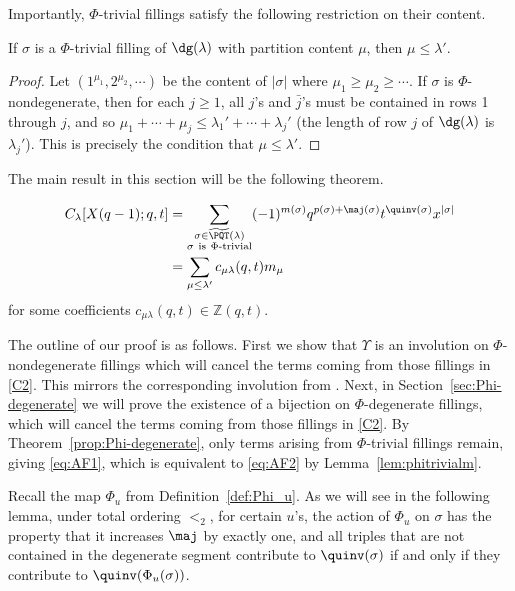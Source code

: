 Importantly, $\Phi$-trivial fillings satisfy the following restriction on their content.

\begin{lemma}\label{lem:phitrivialm}
If $\sigma$ is a $\Phi$-trivial filling of $\dg(\lambda)$ with partition content $\mu$, then $\mu \leq \lambda'$.
\end{lemma}

\begin{proof}
Let $(1^{\mu_1},2^ {\mu_2},\cdots)$ be the content of $|\sigma|$ where $\mu_1\geq \mu_2\geq \cdots$. If $\sigma$ is $\Phi$-nondegenerate, then for each $j \geq 1$, all $j$'s and $\bar{j}$'s must be contained in rows 1 through $j$, and so $\mu_1+\cdots+\mu_j \leq \lambda_1'+\cdots+\lambda_j'$ (the length of row $j$ of $\dg(\lambda)$ is $\lambda_j'$). This is precisely the condition that $\mu\leq \lambda'$.
\end{proof}


The main result in this section will be the following theorem.

\begin{theorem}\label{thm:A2FP}
\begin{align}
C_{\lambda}[X(q-1);q,t]& = \sum_{\substack{\sigma\in\widetilde{\PQT}(\lambda)\\\sigma\ \text{is}\ \Phi\text{-trivial}}} (-1)^{m(\sigma)} q^{p(\sigma)+\maj(\sigma)}t^{\quinv(\sigma)}x^{|\sigma|}\label{eq:AF1}\\
&=\sum_{\mu \leq \lambda'} c_{\mu\lambda}(q,t)m_{\mu}\label{eq:AF2}
\end{align}
for some coefficients $c_{\mu\lambda}(q,t)\in\mathbb{Z}(q,t)$.
\end{theorem}

The outline of our proof is as follows. First we show that $\Upsilon$ is an involution on $\Phi$-nondegenerate fillings which will cancel the terms coming from those fillings in \eqref{C2}. This mirrors the corresponding involution from \cite[Section 5.2]{HHL05}. Next, in Section~\ref{sec:Phi-degenerate} we will prove the existence of a bijection on $\Phi$-degenerate fillings, which will cancel the terms coming from those fillings in \eqref{C2}. By Theorem~\ref{prop:Phi-degenerate}, only terms arising from $\Phi$-trivial fillings remain, giving \eqref{eq:AF1}, which is equivalent to \eqref{eq:AF2} by Lemma~\ref{lem:phitrivialm}.

Recall the map $\Phi_u$ from Definition~\ref{def:Phi_u}. As we will see in the following lemma, under total ordering $<_2$, for certain $u$'s, the action of $\Phi_u$ on $\sigma$ has the property that it increases $\maj$ by exactly one, and all triples that are not contained in the degenerate segment contribute to $\quinv(\sigma)$ if and only if they contribute to $\quinv(\Phi_u(\sigma))$.

